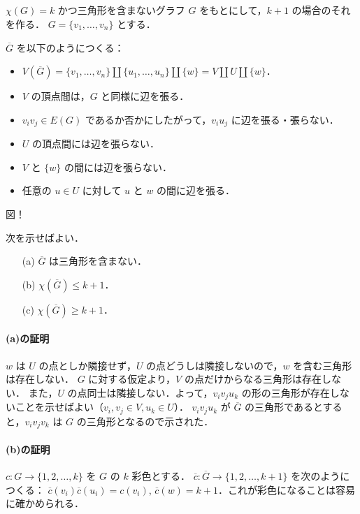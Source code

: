 \subsection{}
$\chi(G) = k$ かつ三角形を含まないグラフ $G$ をもとにして，$k+1$ の場合のそれを作る．
$G = \{v_1,\ldots,v_n\}$ とする．

$\overline{G}$ を以下のようにつくる：
\begin{itemize}
 \item $V(\overline{G}) = \{v_1,\ldots,v_n\} \amalg \{u_1,\ldots,u_n\} \amalg \{w\} = V \amalg U\amalg \{w\}$．
 \item $V$ の頂点間は，$G$ と同様に辺を張る．
 \item $v_iv_j\in E(G)$ であるか否かにしたがって，$v_iu_j$ に辺を張る・張らない．
 \item $U$ の頂点間には辺を張らない．
 \item $V$ と $\{w\}$ の間には辺を張らない．
 \item 任意の $u\in U$ に対して $u$ と $w$ の間に辺を張る．
\end{itemize}

{\Huge 図！}

次を示せばよい．

\begin{enumerate}
 \item[(a)] $\overline{G}$ は三角形を含まない．
 \item[(b)] $\chi(\overline{G})\leq k+1$．
 \item[(c)] $\chi(\overline{G})\geq k+1$．
\end{enumerate}

\paragraph{(a)の証明}
$w$ は $U$ の点としか隣接せず，$U$ の点どうしは隣接しないので，$w$ を含む三角形は存在しない．
$G$ に対する仮定より，$V$ の点だけからなる三角形は存在しない．
また，$U$ の点同士は隣接しない．よって，$v_iv_ju_k$ の形の三角形が存在しないことを示せばよい（$v_i,v_j\in V, u_k\in U$）．
$v_iv_ju_k$ が $\overline{G}$ の三角形であるとすると，$v_iv_jv_k$ は $G$ の三角形となるので示された．

\paragraph{(b)の証明}
$c\colon G\longrightarrow \{1,2,\ldots,k\}$ を $G$ の $k$ 彩色とする．
$\overline{c}\colon \overline{G}\longrightarrow \{1,2,\ldots,k+1\}$ を次のようにつくる：
$\overline{c}(v_i) \overline{c}(u_i) = c(v_i)$, $\overline{c}(w) = k+1$．これが彩色になることは容易に確かめられる．

